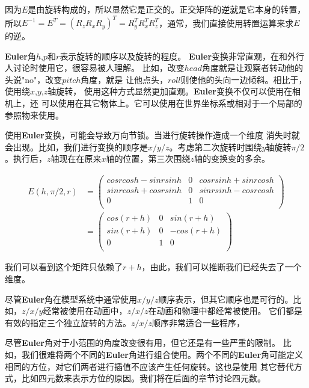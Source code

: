 \documentclass{ctexart}
\begin{document}
因为$E$是由旋转构成的，所以显然它是正交的。正交矩阵的逆就是它本身的转置，
所以$E^{-1}=E^{T}=(R_{z}R_{x}R_{y})^{T}=R_{y}^{T}R_{x}^{T}R_{z}^{T}$，通常，我们直接使用转置运算来求$E$的逆。

\textbf{Euler}角$h$,$p$和$r$表示旋转的顺序以及旋转的程度。
\textbf{Euler}变换非常直观，在和外行人讨论时使用它，很容易被人理解。
比如，改变$head$角度就是让观察者转动他的头说"no"，改变$pitch$角度，就是
让他点头，$roll$则使他的头向一边倾斜。相比于，使用绕$x$,$y$,$z$轴旋转，
使用这种方式显然更加直观。\textbf{Euler}变换不仅可以使用在相机上，还
可以使用在其它物体上。它可以使用在世界坐标系或相对于一个局部的参照物来使用。

使用\textbf{Euler}变换，可能会导致万向节锁。当进行旋转操作造成一个维度
消失时就会出现。比如，我们进行变换的顺序是$x/y/z$。考虑第二次旋转时围绕$y$轴旋转$\pi/2$。执行后，$z$轴现在在原来$x$轴的位置，第三次围绕$z$轴的变换变的多余。

\begin{equation}
	\label{GImbalLock}
	\begin{split}
	E(h,\pi/2,r)&=
	\left(
		\begin{array}{ccc}
			cosrcosh-sinrsinh & 0 & cosrsinh+sinrcosh\\
			sinrcosh+cosrsinh & 0 & sinrsinh-cosrcosh\\
			0                 & 1 &                 0\\
		\end{array}
	\right)\\
	&=
	\left(
	\begin{array}{ccc}
	cos(r+h) & 0 & sin(r+h)\\
	sin(r+h) & 0 & -cos(r+h)\\
	0 & 1 & 0\\
	\end{array}
	\right)
	\end{split}
\end{equation}

我们可以看到这个矩阵只依赖了$r+h$，由此，我们可以推断我们已经失去了一个维度。

尽管\textbf{Euler}角在模型系统中通常使用$x/y/z$顺序表示，但其它顺序也是可行的。比如，$z/x/y$经常被使用在动画中，$z/x/z$在动画和物理中都经常被使用。
它们都是有效的指定三个独立旋转的方法。$z/x/z$顺序非常适合一些程序，

尽管\textbf{Euler}角对于小范围的角度改变很有用，但它还是有一些严重的限制。
比如，我们很难将两个不同的\textbf{Euler}角进行组合使用。两个不同的\textbf{Euler}角可能定义相同的方位，对它们两者进行插值不应该产生任何旋转。这也是使用
其它替代方式，比如四元数来表示方位的原因。我们将在后面的章节讨论四元数。
\end{document}
